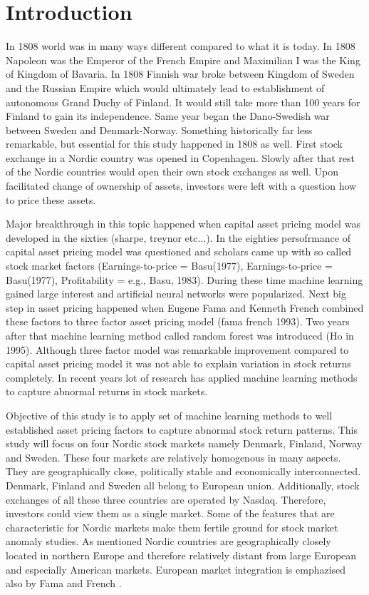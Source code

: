 \documentclass{article}
\begin{document}
\section{Introduction} \label{Introduction}
In 1808 world was in many ways different compared to what it is today. In 1808 Napoleon was the Emperor of the French Empire and Maximilian I was the King of Kingdom of Bavaria. In 1808 Finnish war broke between Kingdom of Sweden and the Russian Empire which would ultimately lead to establishment of autonomous Grand Duchy of Finland. It would still take more than 100 years for Finland to gain its independence. Same year began the Dano-Swedish war between Sweden and Denmark-Norway. Something historically far less remarkable, but essential for this study happened in 1808 as well. First stock exchange in a Nordic country was opened in Copenhagen. Slowly after that rest of the Nordic countries would open their own stock exchanges as well. Upon facilitated change of ownership of assets, investors were left with a question how to price these assets. \par

Major breakthrough in this topic happened when capital asset pricing model was developed in the sixties (sharpe, treynor etc...). In the eighties persofrmance of capital asset pricing model was questioned and scholars came up with so called stock market factors (Earnings-to-price = Basu(1977), Earnings-to-price = Basu(1977), Profitability = e.g., Basu, 1983). During these time machine learning gained large interest and artificial neural networks were popularized. Next big step in asset pricing happened when Eugene Fama and Kenneth French combined these factors to three factor asset pricing model (fama french 1993). Two years after that machine learning method called random forest was introduced (Ho in 1995). Although three factor model was remarkable improvement compared to capital asset pricing model it was not able to explain variation in stock returns completely. In recent years lot of research has applied machine learning methods to capture abnormal returns in stock markets. \par

Objective of this study is to apply set of machine learning methods to well established asset pricing factors to capture abnormal stock return patterns. This study will focus on four Nordic stock markets namely Denmark, Finland, Norway and Sweden. These four markets are relatively homogenous in many aspects. They are geographically close, politically stable and economically interconnected. Denmark, Finland and Sweden all belong to European union. Additionally, stock exchanges of all these three countries are operated by Nasdaq. Therefore, investors could view them as a single market. Some of the features that are characteristic for Nordic markets make them fertile ground for stock market anomaly studies. As mentioned Nordic countries are geographically closely located in northern Europe and therefore relatively distant from large European and especially American markets. European market integration is emphazised also by Fama and French \citeyear{FAMA2012457}. \par
\end{document}
